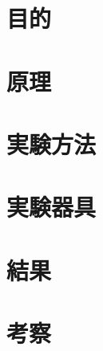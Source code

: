 \documentclass[a4j,10pt]{jarticle}
\title{}
\author{高浜　陸生}
\date{2013年}
\begin{document}
\section{目的}

\section{原理}

\section{実験方法}

\section{実験器具}

\section{結果}

\section{考察}
\end{document}
